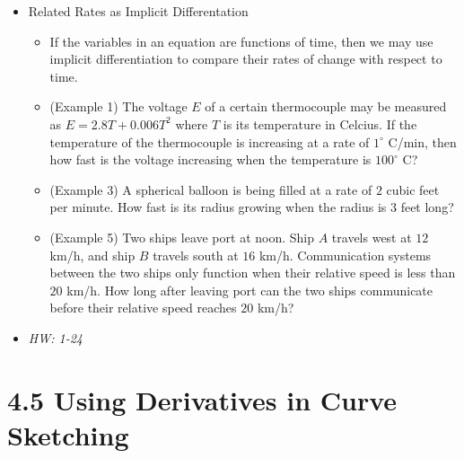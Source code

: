 \documentclass[11pt]{article}
\begin{document}
\begin{itemize}
\item Related Rates as Implicit Differentation
  \begin{itemize}
    \item If the variables in an equation are functions of time, then
          we may use implicit differentiation to compare their rates of
          change with respect to time.
    \item (Example 1) The voltage \(E\) of a certain thermocouple may
          be measured as \(E=2.8T+0.006 T^2\) where \(T\) is its temperature
          in Celcius. If the temperature of the thermocouple is increasing
          at a rate of \(1^\circ\) C/min, then how fast is the voltage
          increasing when the temperature is \(100^\circ\) C?
    \item (Example 3) A spherical balloon is being filled at a rate of
          \(2\) cubic feet per minute. How fast is its radius growing
          when the radius is \(3\) feet long?
    \item (Example 5) Two ships leave port at noon. Ship \(A\) travels
          west at \(12\) km/h, and ship \(B\) travels south at \(16\) km/h.
          Communication systems between the two ships only function when
          their relative speed is less than \(20\) km/h. How long after leaving
          port can the two ships communicate before their relative speed
          reaches \(20\) km/h?
  \end{itemize}
\item\textit{
  HW: 1-24
}
\end{itemize}

\section*{4.5 Using Derivatives in Curve Sketching}
\end{document}
